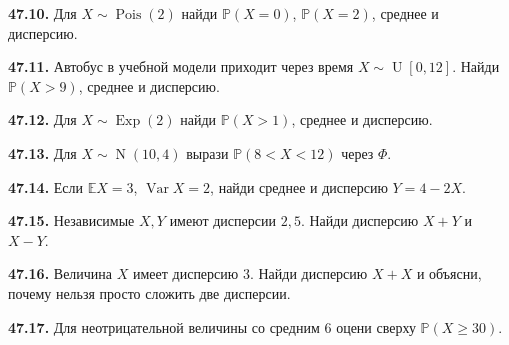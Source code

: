 \noindent\begin{minipage}[t]{\linewidth}\textbf{47.10.} Для \(X\sim\operatorname{Pois}(2)\) найди \(\mathbb P(X=0)\), \(\mathbb P(X=2)\), среднее и дисперсию.\par\end{minipage}\par
\noindent\begin{minipage}[t]{\linewidth}\textbf{47.11.} Автобус в учебной модели приходит через время \(X\sim\operatorname U[0,12]\). Найди \(\mathbb P(X>9)\), среднее и дисперсию.\par\end{minipage}\par
\noindent\begin{minipage}[t]{\linewidth}\textbf{47.12.} Для \(X\sim\operatorname{Exp}(2)\) найди \(\mathbb P(X>1)\), среднее и дисперсию.\par\end{minipage}\par
\noindent\begin{minipage}[t]{\linewidth}\textbf{47.13.} Для \(X\sim\operatorname N(10,4)\) вырази \(\mathbb P(8<X<12)\) через \(\Phi\).\par\end{minipage}\par
\noindent\begin{minipage}[t]{\linewidth}\textbf{47.14.} Если \(\mathbb EX=3\), \(\operatorname{Var}X=2\), найди среднее и дисперсию \(Y=4-2X\).\par\end{minipage}\par
\noindent\begin{minipage}[t]{\linewidth}\textbf{47.15.} Независимые \(X,Y\) имеют дисперсии \(2,5\). Найди дисперсию \(X+Y\) и \(X-Y\).\par\end{minipage}\par
\noindent\begin{minipage}[t]{\linewidth}\textbf{47.16.} Величина \(X\) имеет дисперсию \(3\). Найди дисперсию \(X+X\) и объясни, почему нельзя просто сложить две дисперсии.\par\end{minipage}\par
\noindent\begin{minipage}[t]{\linewidth}\textbf{47.17.} Для неотрицательной величины со средним \(6\) оцени сверху \(\mathbb P(X\ge30)\).\par\end{minipage}\par

